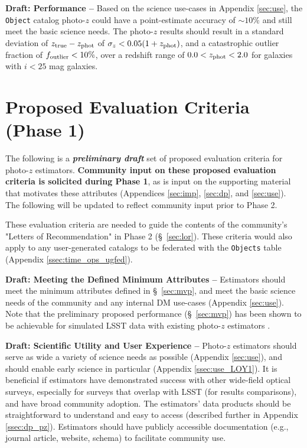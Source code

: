 \documentclass[DM,lsstdraft,toc]{lsstdoc}
\begin{document}
{\bf Draft: Performance --} 
Based on the science use-cases in Appendix \ref{sec:use}, the {\tt Object} catalog photo-$z$ could have a point-estimate accuracy of $\sim10\%$ and still meet the basic science needs.
The photo-$z$ results should result in a standard deviation of $z_{\rm true}-z_{\rm phot}$ of $\sigma_z < 0.05(1+z_{\rm phot})$, and a catastrophic outlier fraction of $f_{\rm outlier} < 10\%$, over a redshift range of $0.0 < z_{\rm phot} < 2.0$ for galaxies with $i<25$ mag galaxies.


\clearpage
\section{Proposed Evaluation Criteria (Phase 1)} \label{sec:eval}

The following is a \textbf{\textit{preliminary draft}} set of proposed evaluation criteria for photo-$z$ estimators. 
\textbf{Community input on these proposed evaluation criteria is solicited during Phase 1}, as is input on the supporting material that motivates these attributes (Appendices \ref{sec:imp}, \ref{sec:dp}, and \ref{sec:use}).
The following will be updated to reflect community input prior to Phase 2.

These evaluation criteria are needed to guide the contents of the community's "Letters of Recommendation" in Phase 2 (\S~\ref{sec:lor}).
These criteria would also apply to any user-generated catalogs to be federated with the {\tt Objects} table (Appendix \ref{ssec:time_ops_ugfed}).

{\bf Draft: Meeting the Defined Minimum Attributes --}
Estimators should meet the minimum attributes defined in \S~\ref{sec:mvp}, and meet the basic science needs of the community and any internal DM use-cases (Appendix \ref{sec:use}).
Note that the preliminary proposed performance (\S~\ref{sec:mvp}) has been shown to be achievable for simulated LSST data with existing photo-$z$ estimators \citep[e.g.,][]{2018AJ....155....1G,2020arXiv200103621S}.

{\bf Draft: Scientific Utility and User Experience --}
Photo-$z$ estimators should serve as wide a variety of science needs as possible (Appendix \ref{sec:use}), and should enable early science in particular (Appendix \ref{ssec:use_LOY1}).
It is beneficial if estimators have demonstrated success with other wide-field optical surveys, especially for surveys that overlap with LSST (for results comparisons), and have broad community adoption.
The estimators' data products should be straightforward to understand and easy to access (described further in Appendix \ref{ssec:dp_pz}).
Estimators should have publicly accessible documentation (e.g., journal article, website, schema) to facilitate community use.
\end{document}
